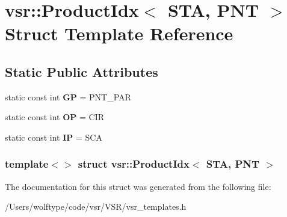 \hypertarget{structvsr_1_1_product_idx_3_01_s_t_a_00_01_p_n_t_01_4}{\section{vsr\-:\-:Product\-Idx$<$ S\-T\-A, P\-N\-T $>$ Struct Template Reference}
\label{structvsr_1_1_product_idx_3_01_s_t_a_00_01_p_n_t_01_4}
}
\subsection*{Static Public Attributes}
\begin{DoxyCompactItemize}
\item 
\hypertarget{structvsr_1_1_product_idx_3_01_s_t_a_00_01_p_n_t_01_4_a70c8f18651e1fd028c8b77ff05a42f81}{static const int {\bfseries G\-P} = P\-N\-T\-\_\-\-P\-A\-R}\label{structvsr_1_1_product_idx_3_01_s_t_a_00_01_p_n_t_01_4_a70c8f18651e1fd028c8b77ff05a42f81}

\item 
\hypertarget{structvsr_1_1_product_idx_3_01_s_t_a_00_01_p_n_t_01_4_a8068fcddf0ac83325554818d944abc54}{static const int {\bfseries O\-P} = C\-I\-R}\label{structvsr_1_1_product_idx_3_01_s_t_a_00_01_p_n_t_01_4_a8068fcddf0ac83325554818d944abc54}

\item 
\hypertarget{structvsr_1_1_product_idx_3_01_s_t_a_00_01_p_n_t_01_4_a66fc5c387be2cbf4ecde1ec89b61b9a0}{static const int {\bfseries I\-P} = S\-C\-A}\label{structvsr_1_1_product_idx_3_01_s_t_a_00_01_p_n_t_01_4_a66fc5c387be2cbf4ecde1ec89b61b9a0}

\end{DoxyCompactItemize}
\subsubsection*{template$<$$>$ struct vsr\-::\-Product\-Idx$<$ S\-T\-A, P\-N\-T $>$}



The documentation for this struct was generated from the following file\-:\begin{DoxyCompactItemize}
\item 
/\-Users/wolftype/code/vsr/\-V\-S\-R/vsr\-\_\-templates.\-h\end{DoxyCompactItemize}
